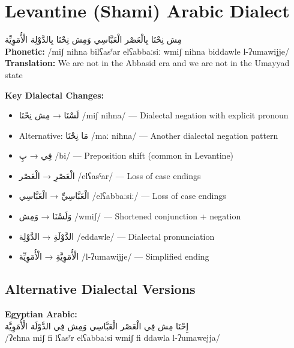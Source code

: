 \documentclass[letterpaper,12pt]{article}
\begin{document}
\section{Levantine (Shami) Arabic Dialect}

\begin{tcolorbox}[colback=white,colframe=dialectcolor,title=\textbf{Levantine Version},breakable]
\textarabic{مِش نِحْنَا بِالْعَصْر الْعَبَّاسِي وَمِش نِحْنَا بِالدَّوْلِة الْأُمَوِيِّة}\\[0.5em]
\textbf{Phonetic:} /miʃ niħna bilʕasˤar elʕabbaːsiː wmiʃ niħna biddawle l-ʔumawijje/\\[0.5em]
\textbf{Translation:} We are not in the Abbasid era and we are not in the Umayyad state
\end{tcolorbox}

\textbf{Key Dialectal Changes:}
\begin{itemize}
\item \textarabic{لَسْنَا} → \textarabic{مِش نِحْنَا} /miʃ niħna/ — Dialectal negation with explicit pronoun
\item Alternative: \textarabic{مَا نِحْنَا} /maː niħna/ — Another dialectal negation pattern
\item \textarabic{فِي} → \textarabic{بِ} /bi/ — Preposition shift (common in Levantine)
\item \textarabic{الْعَصْرِ} → \textarabic{الْعَصْر} /elʕasˤar/ — Loss of case endings
\item \textarabic{الْعَبَّاسِيِّ} → \textarabic{الْعَبَّاسِي} /elʕabbaːsiː/ — Loss of case endings
\item \textarabic{وَلَسْنَا} → \textarabic{وَمِش} /wmiʃ/ — Shortened conjunction + negation
\item \textarabic{الدَّوْلَةِ} → \textarabic{الدَّوْلِة} /eddawle/ — Dialectal pronunciation
\item \textarabic{الْأُمَوِيَّةِ} → \textarabic{الْأُمَوِيِّة} /l-ʔumawijje/ — Simplified ending
\end{itemize}

\subsection{Alternative Dialectal Versions}

\textbf{Egyptian Arabic:}\\
\textarabic{إِحْنَا مِش فِي الْعَصْر الْعَبَّاسِي وَمِش فِي الدَّوْلَة الْأُمَوِيَّة}\\
/ʔeħna miʃ fi lʕasˤr elʕabbaːsi wmiʃ fi ddawla l-ʔumawejja/
\end{document}
